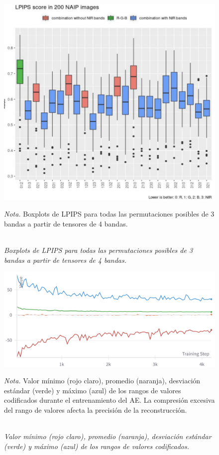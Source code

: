 \begin{figure}[H]
    \caption{\doublespacing \\ \textit{Boxplots de LPIPS para todas las permutaciones posibles de 3 bandas a partir de tensores de 4 bandas.}} 
    \centering
    \includegraphics[width=1\linewidth]{images/lpips_permutation.png}
    \begin{justify}
        \textit{Nota.} Boxplots de LPIPS para todas las permutaciones posibles de 3 bandas a partir de tensores de 4 bandas.
    \end{justify}                    
    \label{fig:lpips_permutation}
\end{figure}

\begin{figure}[H]
    \caption{\doublespacing \\ \textit{Valor mínimo (rojo claro), promedio (naranja), desviación estándar (verde) y máximo (azul) de los rangos de valores codificados.}} 
    \centering
    \includegraphics[width=1\linewidth]{images/simon/ae_distr_enc.png}
    \begin{justify}
        \textit{Nota.} Valor mínimo (rojo claro), promedio (naranja), desviación estándar (verde) y máximo (azul) de los rangos de valores codificados durante el entrenamiento del AE. La compresión excesiva del rango de valores afecta la precisión de la reconstrucción.
    \end{justify}                    
    \label{fig:ae_distr_enc}
\end{figure}

